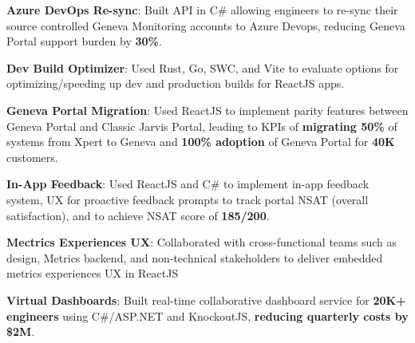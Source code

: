 \documentclass[letterpaper,11pt]{article}
\newcommand{\resumeItem}[2]{
  \item\small{
    \textbf{#1}{: #2 \vspace{-2pt}}
  }
}
\begin{document}
        
        \resumeItem{Azure DevOps Re-sync}{Built API in C\# allowing engineers to re-sync their source controlled Geneva Monitoring accounts to Azure Devops, reducing Geneva Portal support burden  by \textbf{30\%}.}


        \resumeItem{Dev Build Optimizer}{Used Rust, Go, SWC, and Vite to evaluate options for optimizing/speeding up dev  and production builds for ReactJS apps.
        }


        \resumeItem{Geneva Portal Migration}{Used ReactJS to implement parity features  between Geneva Portal and Classic Jarvis Portal, leading to KPIs of \textbf{migrating 50\%} of systems from Xpert to Geneva and \textbf{100\% adoption} of Geneva Portal for \textbf{40K} customers.    
        }
        
       \resumeItem{In-App Feedback}{Used ReactJS and C\# to implement in-app feedback system, UX for proactive feedback prompts to track portal NSAT (overall satisfaction), and to achieve NSAT score of \textbf{185/200}.
        }

       \resumeItem{Mectrics Experiences UX}{Collaborated with cross-functional teams such as design, Metrics backend, and non-technical stakeholders to deliver embedded metrics experiences UX in ReactJS
       }

       \resumeItem{Virtual Dashboards}{Built real-time collaborative dashboard service for \textbf{20K+ engineers} using C\#/ASP.NET and KnockoutJS, \textbf{reducing quarterly costs by \$2M}.} 

\end{document}
